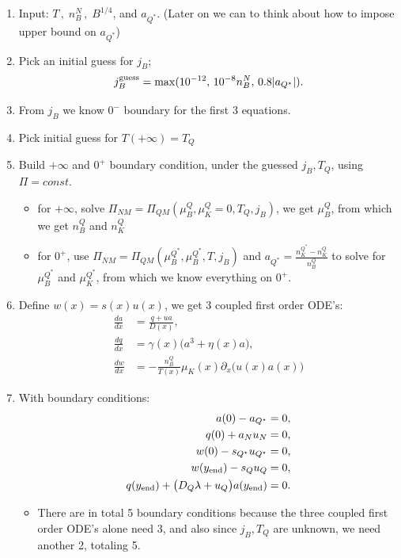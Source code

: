 \documentclass[11pt]{article}
\begin{document}
\begin{enumerate}
\item Input: $T\,,\; n_B^N\,,\; B^{1/4}$, and $a_{Q^\ast}$. (Later on we can to think about how to impose upper bound on $a_{Q^*}$)
\item Pick an initial guess for $j_B$; 
\begin{equation}
j_B^{\rm guess}
=
\max(10^{-12},\,10^{-8}n_B^N,\,0.8 |a_{Q^\star}|).
\end{equation}
\item From $j_B$ we know $0^-$ boundary for the first 3 equations. 
\item Pick initial guess for $T(+\infty) = T_Q$
\item Build $+\infty$ and $0^+$ boundary condition, under the guessed $j_B, T_Q$, using $\Pi = const.$
\begin{itemize}
\item for $+\infty$, solve $\Pi_{NM} = \Pi_{QM}(\mu_B^Q, \mu_K^Q=0, T_Q, j_B)$, we get $\mu_B^Q$, from which we get $n_B^Q$ and $n_K^Q$
\item for $0^+$, use $\Pi_{NM} = \Pi_{QM}(\mu_B^{Q^*}, \mu_B^{Q^*}, T,j_B)$ and $a_{Q^*} = \frac{n_K^{Q^*} - n_K^Q}{n_B^Q}$ to solve for $\mu_B^{Q^*}$ and $\mu_K^{Q^*}$, from which we know everything on $0^+$.
\end{itemize}
\item Define $w(x) = s(x)u(x)$, we get 3 coupled first order ODE's:
\begin{align}
\frac{da}{dx} &= \frac{q+u a}{D(x)},\\
\frac{dq}{dx} &= \gamma(x)\bigl(a^3+\eta(x)a\bigr),\\
\frac{dw}{dx} &= -\frac{n_B^Q}{T(x)}\mu_K(x)\partial_x\Big(u(x) a(x)\Big)%
\end{align}
\item With boundary conditions:
\begin{align}
a(0)-a_{Q^\star} &= 0,\\
q(0)+a_Nu_N &= 0,\\
w(0)-s_{Q^\star}u_{Q^\star} &= 0,\\
w(y_{\rm end}) - s_Qu_Q &= 0,\\
q(y_{\rm end})+\bigl(D_Q\lambda+u_Q\bigr)a(y_{\rm end}) &= 0.
\end{align}
\begin{itemize}
    \item There are in total 5 boundary conditions because the three coupled first order ODE's alone need 3, and also since $j_B, T_Q$ are unknown, we need another 2, totaling 5.

\end{itemize}
\end{enumerate}
\end{document}
